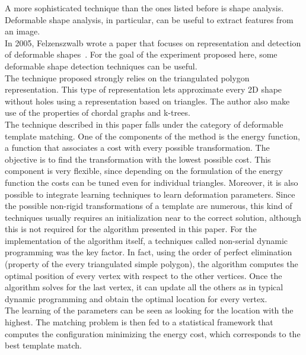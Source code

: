 \documentclass[conference]{IEEEtran}
\begin{document}
				A more sophisticated technique than the ones listed before is shape analysis. Deformable shape analysis, in particular, can be useful to extract features from an image.\\
				In 2005, Felzenszwalb wrote a paper that focuses on representation and detection of deformable shapes~\cite{felzenszwalb2005representation}. For the goal of the experiment proposed here, some deformable shape 
				detection techniques can be useful. \\
				The technique proposed strongly relies on the triangulated polygon representation. This type of representation lets approximate every 2D shape without holes using a representation based on triangles. 
				The author also make use of the properties of chordal graphs and k-trees.\\
				The technique described in this paper falls under the category of deformable template matching. One of the components of the method is the energy function, a function that associates a cost with every 
				possible transformation. The objective is to find the transformation with the lowest possible cost. This component is very flexible, since depending on the formulation of the energy function the costs 
				can be tuned even for individual triangles. Moreover, it is also possible to integrate learning techniques to learn deformation parameters.
				Since the possible non-rigid transformations of a template are numerous, this kind of techniques usually requires an initialization near to the correct solution, 
				although this is not required for the algorithm presented in this paper. 
				For the implementation of the algorithm itself, a techniques called non-serial dynamic programming was the key factor. In fact, using the order of perfect elimination (property of the every triangulated 
				simple polygon), the algorithm computes the optimal position of every vertex with respect to the other vertices. Once the algorithm solves for the last vertex, it can 
				update all the others as in typical dynamic programming and obtain the optimal location for every vertex.\\
				The learning of the parameters can be seen as looking for the location with the highest. The matching problem is then fed to a statistical framework that computes the configuration minimizing the 
				energy cost, which corresponds to the best template match.
				
\end{document}
